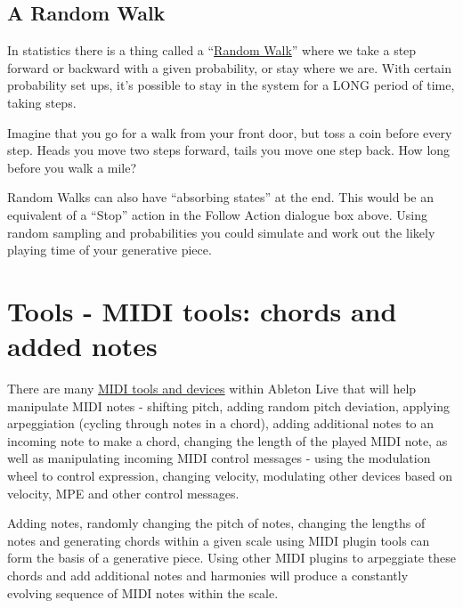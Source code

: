 \documentclass[
  12pt,
  letterpaper,
  oneside,
  open=any]{scrbook}
\begin{document}
\section{A Random Walk}\label{a-random-walk}

In statistics there is a thing called a
``\href{https://en.wikipedia.org/wiki/Random_walk}{Random Walk}'' where
we take a step forward or backward with a given probability, or stay
where we are. With certain probability set ups, it's possible to stay in
the system for a LONG period of time, taking steps.

Imagine that you go for a walk from your front door, but toss a coin
before every step. Heads you move two steps forward, tails you move one
step back. How long before you walk a mile?

Random Walks can also have ``absorbing states'' at the end. This would
be an equivalent of a ``Stop'' action in the Follow Action dialogue box
above. Using random sampling and probabilities you could simulate and
work out the likely playing time of your generative piece.


\chapter{Tools - MIDI tools: chords and added
notes}\label{Chapter-004-Tools-MIDI_tools}

There are many
\href{https://www.ableton.com/en/live-manual/11/live-midi-effect-reference/\#live-midi-effect-reference}{MIDI
tools and devices} within Ableton Live that will help manipulate MIDI
notes - shifting pitch, adding random pitch deviation, applying
arpeggiation (cycling through notes in a chord), adding additional notes
to an incoming note to make a chord, changing the length of the played
MIDI note, as well as manipulating incoming MIDI control messages -
using the modulation wheel to control expression, changing velocity,
modulating other devices based on velocity, MPE and other control
messages.

\begin{tcolorbox}[enhanced jigsaw, opacitybacktitle=0.6, rightrule=.15mm, leftrule=.75mm, opacityback=0, toptitle=1mm, toprule=.15mm, breakable, titlerule=0mm, colback=white, bottomtitle=1mm, title=\textcolor{quarto-callout-tip-color}{\faLightbulb}\hspace{0.5em}{Key idea}, coltitle=black, left=2mm, colframe=quarto-callout-tip-color-frame, bottomrule=.15mm, colbacktitle=quarto-callout-tip-color!10!white, arc=.35mm]

Adding notes, randomly changing the pitch of notes, changing the lengths
of notes and generating chords within a given scale using MIDI plugin
tools can form the basis of a generative piece. Using other MIDI plugins
to arpeggiate these chords and add additional notes and harmonies will
produce a constantly evolving sequence of MIDI notes within the scale.

\end{tcolorbox}
\end{document}
